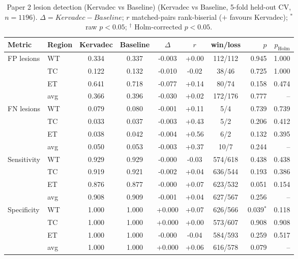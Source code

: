 \begin{table}[t]
\centering
\caption{Paper 2 lesion detection (Kervadec vs Baseline) (Kervadec vs Baseline, 5-fold held-out CV, $n=1196$). $\Delta=Kervadec-Baseline$; $r$ matched-pairs rank-biserial ($+$ favours Kervadec); $^{*}$ raw $p<0.05$; $^{\dagger}$ Holm-corrected $p<0.05$.}
\label{tab:p2_baseline_det}
\begin{tabular}{llcccccrr}
\toprule
Metric & Region & Kervadec & Baseline & $\Delta$ & $r$ & win/loss & $p$ & $p_{\mathrm{Holm}}$ \\
\midrule
\multirow{4}{*}{FP lesions} & WT & 0.334 & 0.337 & -0.003 & +0.00 & 112/112 & 0.945 & 1.000 \\
 & TC & 0.122 & 0.132 & -0.010 & -0.02 & 38/46 & 0.725 & 1.000 \\
 & ET & 0.641 & 0.718 & -0.077 & +0.14 & 80/74 & 0.158 & 0.474 \\
 & avg & 0.366 & 0.396 & -0.030 & +0.02 & 172/176 & 0.777 & -- \\
\midrule
\multirow{4}{*}{FN lesions} & WT & 0.079 & 0.080 & -0.001 & +0.11 & 5/4 & 0.739 & 0.739 \\
 & TC & 0.033 & 0.037 & -0.003 & +0.43 & 5/2 & 0.206 & 0.412 \\
 & ET & 0.038 & 0.042 & -0.004 & +0.56 & 6/2 & 0.132 & 0.395 \\
 & avg & 0.050 & 0.053 & -0.003 & +0.37 & 10/7 & 0.244 & -- \\
\midrule
\multirow{4}{*}{Sensitivity} & WT & 0.929 & 0.929 & -0.000 & -0.03 & 574/618 & 0.438 & 0.438 \\
 & TC & 0.919 & 0.921 & -0.002 & +0.04 & 636/544 & 0.193 & 0.386 \\
 & ET & 0.876 & 0.877 & -0.000 & +0.07 & 623/532 & 0.051 & 0.154 \\
 & avg & 0.908 & 0.909 & -0.001 & +0.04 & 627/567 & 0.256 & -- \\
\midrule
\multirow{4}{*}{Specificity} & WT & 1.000 & 1.000 & +0.000 & +0.07 & 626/566 & 0.039$^{*}$ & 0.118 \\
 & TC & 1.000 & 1.000 & +0.000 & +0.00 & 573/607 & 0.908 & 0.908 \\
 & ET & 1.000 & 1.000 & -0.000 & -0.04 & 584/593 & 0.259 & 0.517 \\
 & avg & 1.000 & 1.000 & +0.000 & +0.06 & 616/578 & 0.079 & -- \\
\midrule
\bottomrule
\end{tabular}
\end{table}

